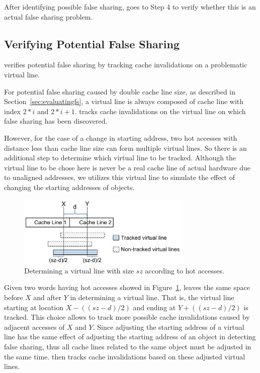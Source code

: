   
After identifying possible false sharing, \Predator{} goes to Step 4 to 
verify whether this is an actual false sharing problem.

\subsection{Verifying Potential False Sharing}
\label{sec:tracking}

\Predator{} verifies potential false sharing by tracking 
cache invalidations on a problematic virtual line.

For potential false sharing caused by double cache line size, as described in
Section~\ref{sec:evaluatingfs}, a virtual line is always composed of 
cache line with index $2*i$ and $2*i+1$. 
\Predator{} tracks cache invalidations
on the virtual line on which false sharing has been discovered.

However, for the case of a change in starting address,
two hot accesses with distance less than cache line size 
can form multiple virtual lines. 
So there is an additional step to determine which virtual line to be tracked.
Although the virtual line to be chose here is never be a real cache line of actual hardware
due to unaligned addresses,
we utilizes this virtual line to simulate the effect of changing the 
starting addresses of objects.


\begin{figure}
\begin{center} 
\includegraphics[width=3.3in]{fig/trackpotential}
\end{center}
\caption{Determining a virtual line with size $sz$ according to hot accesses.}
\label{fig:trackpotential}
\end{figure}

Given two words having hot accesses showed in Figure~\ref{fig:trackpotential}, 
\Predator{} leaves the same space before $X$ and after $Y$ in determining a virtual line. 
That is, the virtual line starting 
at location $X-((sz-d)/2)$ and ending at $Y+((sz-d)/2)$ is tracked. 
This choice allows to track more possible cache invalidations caused by
adjacent accesses of $X$ and $Y$. 
Since adjusting the starting address of a virtual line has the same effect of
adjusting the starting address of an object in detecting false sharing, thus
all cache lines related to the same object must be adjusted in the same time.
\Predator{} then tracks cache invalidations based on these adjusted virtual lines.

